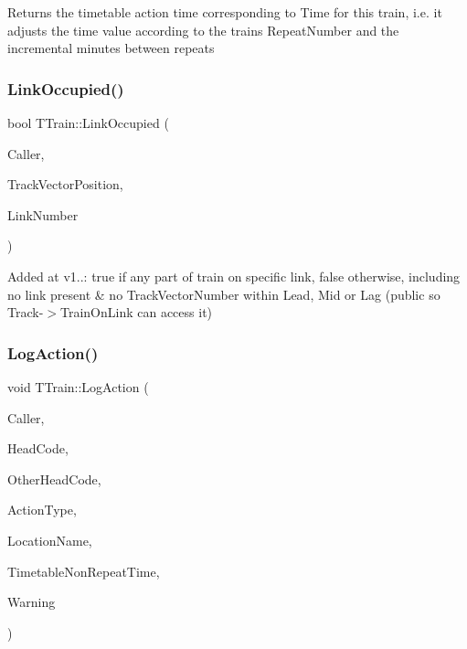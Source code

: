 Returns the timetable action time corresponding to \textquotesingle{}Time\textquotesingle{} for this train, i.\+e. it adjusts the time value according to the train\textquotesingle{}s Repeat\+Number and the incremental minutes between repeats \mbox{\label{class_t_train_aef32cd9a007874ab09ceeac907e7c88b}} 
\subsubsection{\texorpdfstring{Link\+Occupied()}{LinkOccupied()}}
{\footnotesize\ttfamily bool T\+Train\+::\+Link\+Occupied (\begin{DoxyParamCaption}\item[{int}]{Caller,  }\item[{int}]{Track\+Vector\+Position,  }\item[{int}]{Link\+Number }\end{DoxyParamCaption})}

Added at v1..\+: true if any part of train on specific link, false otherwise, including no link present \& no Track\+Vector\+Number within Lead, Mid or Lag (public so Track-\/$>$Train\+On\+Link can access it) \mbox{\label{class_t_train_a493ab1c185d29bf28ec8fded2356e9fc}} 
\subsubsection{\texorpdfstring{Log\+Action()}{LogAction()}}
{\footnotesize\ttfamily void T\+Train\+::\+Log\+Action (\begin{DoxyParamCaption}\item[{int}]{Caller,  }\item[{Ansi\+String}]{Head\+Code,  }\item[{Ansi\+String}]{Other\+Head\+Code,  }\item[{T\+Action\+Type}]{Action\+Type,  }\item[{Ansi\+String}]{Location\+Name,  }\item[{T\+Date\+Time}]{Timetable\+Non\+Repeat\+Time,  }\item[{bool}]{Warning }\end{DoxyParamCaption})\hspace{0.3cm}{\ttfamily [private]}}

